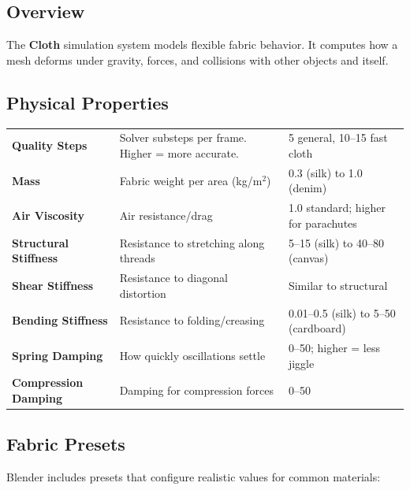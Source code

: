 \subsection{Overview}

The \textbf{Cloth} simulation system models flexible fabric behavior. It computes how a mesh deforms under gravity, forces, and collisions with other objects and itself.

\subsection{Physical Properties}

\begin{center}
\begin{tabularx}{\textwidth}{L{3cm}L{4.5cm}X}
\toprule
{}
 &  &  \\
\midrule
\textbf{Quality Steps} & Solver substeps per frame. Higher = more accurate. & 5 general, 10--15 fast cloth \\
\textbf{Mass} & Fabric weight per area (kg/m$^2$) & 0.3 (silk) to 1.0 (denim) \\
\textbf{Air Viscosity} & Air resistance/drag & 1.0 standard; higher for parachutes \\
\textbf{Structural Stiffness} & Resistance to stretching along threads & 5--15 (silk) to 40--80 (canvas) \\
\textbf{Shear Stiffness} & Resistance to diagonal distortion & Similar to structural \\
\textbf{Bending Stiffness} & Resistance to folding/creasing & 0.01--0.5 (silk) to 5--50 (cardboard) \\
\textbf{Spring Damping} & How quickly oscillations settle & 0--50; higher = less jiggle \\
\textbf{Compression Damping} & Damping for compression forces & 0--50 \\
\bottomrule
\end{tabularx}
\end{center}

\subsection{Fabric Presets}

Blender includes presets that configure realistic values for common materials:

